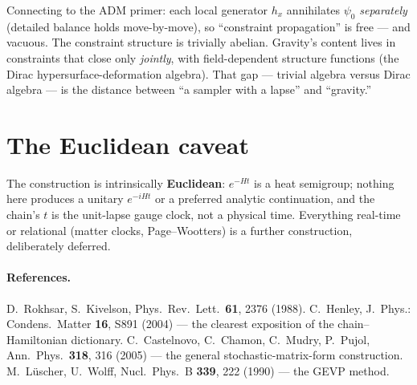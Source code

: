 \documentclass[11pt]{article}
\begin{document}
Connecting to the ADM primer: each local generator $h_x$ annihilates $\psi_0$
\emph{separately} (detailed balance holds move-by-move), so ``constraint propagation''
is free --- and vacuous. The constraint structure is trivially abelian. Gravity's
content lives in constraints that close only \emph{jointly}, with field-dependent
structure functions (the Dirac hypersurface-deformation algebra). That gap --- trivial
algebra versus Dirac algebra --- is the distance between ``a sampler with a lapse'' and
``gravity.''

\section{The Euclidean caveat}

The construction is intrinsically \textbf{Euclidean}: $e^{-Ht}$ is a heat semigroup;
nothing here produces a unitary $e^{-iHt}$ or a preferred analytic continuation, and
the chain's $t$ is the unit-lapse gauge clock, not a physical time. Everything
real-time or relational (matter clocks, Page--Wootters) is a further construction,
deliberately deferred.

\paragraph{References.}
D.~Rokhsar, S.~Kivelson, Phys.\ Rev.\ Lett.\ \textbf{61}, 2376 (1988).
C.~Henley, J.~Phys.: Condens.\ Matter \textbf{16}, S891 (2004) --- the clearest
exposition of the chain--Hamiltonian dictionary.
C.~Castelnovo, C.~Chamon, C.~Mudry, P.~Pujol, Ann.\ Phys.\ \textbf{318}, 316 (2005) ---
the general stochastic-matrix-form construction.
M.~L\"uscher, U.~Wolff, Nucl.\ Phys.\ B \textbf{339}, 222 (1990) --- the GEVP method.
\end{document}
